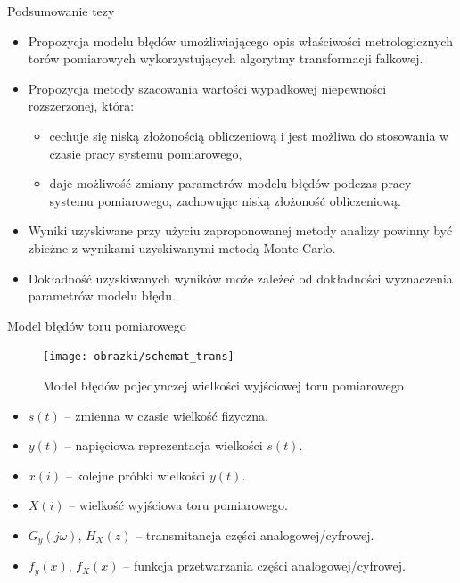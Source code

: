 \documentclass[12pt, polish, aspectratio = 169]{slides}
\begin{document}
\begin{frame}{Podsumowanie tezy}
\begin{itemize}
\item Propozycja modelu błędów umożliwiającego opis właściwości metrologicznych torów pomiarowych wykorzystujących algorytmy transformacji falkowej.
\item Propozycja metody szacowania wartości wypadkowej niepewności rozszerzonej, która:
	\begin{itemize}
	\item cechuje się niską złożonością obliczeniową i jest możliwa do stosowania w czasie pracy systemu pomiarowego,
	\item daje możliwość zmiany parametrów modelu błędów podczas pracy systemu pomiarowego, zachowując niską złożoność obliczeniową.
	\end{itemize}
\item Wyniki uzyskiwane przy użyciu zaproponowanej metody analizy powinny być zbieżne z wynikami uzyskiwanymi metodą Monte Carlo.
\item Dokładność uzyskiwanych wyników może zależeć od dokładności wyznaczenia parametrów modelu błędu.
\end{itemize}
\end{frame}


\begin{frame}{Model błędów toru pomiarowego}
\begin{figure}
\texttt{[image: obrazki/schemat\_trans]}
\caption{Model błędów pojedynczej wielkości wyjściowej toru pomiarowego}
\end{figure}
\begin{itemize}
\item $s(t)$ -- zmienna w czasie wielkość fizyczna.
\item $y(t)$ -- napięciowa reprezentacja wielkości $s(t)$.
\item $x(i)$ -- kolejne próbki wielkości $y(t)$.
\item $X(i)$ -- wielkość wyjściowa toru pomiarowego.
\item $G_{y}(j\omega)$, $H_{X}(z)$ -- transmitancja części analogowej/cyfrowej.
\item $f_{y}(x)$, $f_{X}(x)$ -- funkcja przetwarzania części analogowej/cyfrowej.
\end{itemize}
\end{frame}
\end{document}
